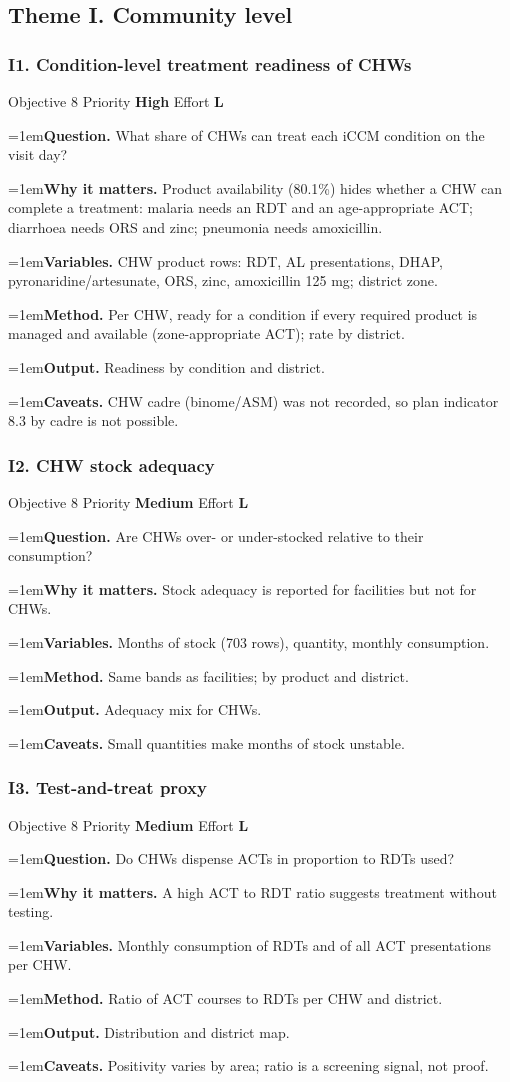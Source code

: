 \documentclass[10pt,a4paper]{article}
\newcommand{\field}[2]{\par\hangindent=1em\textbf{#1.} #2}
\begin{document}
\subsection{Theme I. Community level}
\subsubsection*{I1. Condition-level treatment readiness of CHWs}
{\footnotesize\color{gray} Objective 8 \textperiodcentered{} Priority \textbf{High} \textperiodcentered{} Effort \textbf{L}}
\field{Question}{What share of CHWs can treat each iCCM condition on the visit day?}
\field{Why it matters}{Product availability (80.1\%) hides whether a CHW can complete a treatment: malaria needs an RDT and an age-appropriate ACT; diarrhoea needs ORS and zinc; pneumonia needs amoxicillin.}
\field{Variables}{CHW product rows: RDT, AL presentations, DHAP, pyronaridine/artesunate, ORS, zinc, amoxicillin 125 mg; district zone.}
\field{Method}{Per CHW, ready for a condition if every required product is managed and available (zone-appropriate ACT); rate by district.}
\field{Output}{Readiness by condition and district.}
\field{Caveats}{CHW cadre (binome/ASM) was not recorded, so plan indicator 8.3 by cadre is not possible.}
\subsubsection*{I2. CHW stock adequacy}
{\footnotesize\color{gray} Objective 8 \textperiodcentered{} Priority \textbf{Medium} \textperiodcentered{} Effort \textbf{L}}
\field{Question}{Are CHWs over- or under-stocked relative to their consumption?}
\field{Why it matters}{Stock adequacy is reported for facilities but not for CHWs.}
\field{Variables}{Months of stock (703 rows), quantity, monthly consumption.}
\field{Method}{Same bands as facilities; by product and district.}
\field{Output}{Adequacy mix for CHWs.}
\field{Caveats}{Small quantities make months of stock unstable.}
\subsubsection*{I3. Test-and-treat proxy}
{\footnotesize\color{gray} Objective 8 \textperiodcentered{} Priority \textbf{Medium} \textperiodcentered{} Effort \textbf{L}}
\field{Question}{Do CHWs dispense ACTs in proportion to RDTs used?}
\field{Why it matters}{A high ACT to RDT ratio suggests treatment without testing.}
\field{Variables}{Monthly consumption of RDTs and of all ACT presentations per CHW.}
\field{Method}{Ratio of ACT courses to RDTs per CHW and district.}
\field{Output}{Distribution and district map.}
\field{Caveats}{Positivity varies by area; ratio is a screening signal, not proof.}
\end{document}
